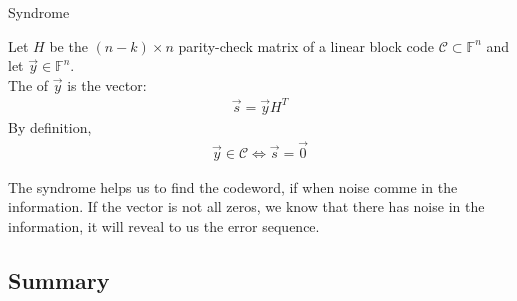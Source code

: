     \begin{parag}{Syndrome}
        \begin{definition}
            Let $H$ be the $\left(n-k\right) \times n$ parity-check matrix of a linear block code $\mathcal{C} \subset \mathbb{F}^n$ and let $\vec{y}\in \mathbb{F}^n$.\\
            The  of $\vec{y}$ is the vector:
            \begin{align*} \vec{s} =  \vec{y}H^T \end{align*}
            By definition, 
            \begin{align*} \vec{y} \in \mathcal{C} \iff \vec{s} =  \vec{0} \end{align*}
        \end{definition}
        The syndrome helps us to find the codeword, if when noise comme in the information. If the vector is not all zeros, we know that there has noise in the information, it will reveal to us the error sequence.

    \end{parag}

    \subsection{Summary}

